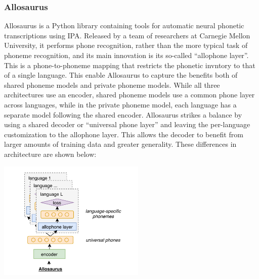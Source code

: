 \fi
\subsubsection{Allosaurus}
Allosaurus is a Python library containing tools for automatic neural phonetic transcriptions 
using IPA.
Released by a team of researchers at Carnegie Mellon University, it performs phone recognition, 
rather than the more typical task of phoneme recognition, and its main innovation is its so-called 
``allophone layer''. This is a phone-to-phoneme mapping that restricts the phonetic invntory to 
that of a single language. This enable Allosaurus to capture the benefits both of shared phoneme 
models and private phoneme models. While all three architectures use an encoder, shared phoneme models 
use a common phone layer across languages, while in the private phoneme model, each language 
has a separate model following the shared encoder. Allosaurus strikes a balance by using a shared 
decoder or ``universal phone layer'' and leaving the per-language customization to the allophone layer. 
This allows the decoder to benefit from larger amounts of training data and greater generality.
These differences in architecture are shown below:
\begin{center}
  \includegraphics[width=7cm]{img/img_alloraurus.png}
\end{center}
%
%
%
%